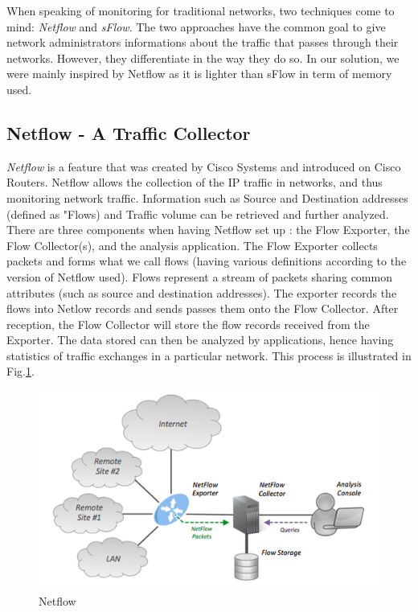 When speaking of monitoring for traditional networks, two techniques come to mind: \textit{Netflow} and \textit{sFlow}. The two approaches have the common goal to give network administrators informations about the traffic that passes through their networks. However, they differentiate in the way they do so. In our solution, we were mainly inspired by Netflow as it is lighter than sFlow in term of memory used.

\subsection{Netflow - A Traffic Collector}

\textit{Netflow} is a feature that was created by Cisco Systems and introduced on Cisco Routers. Netflow allows the collection of the IP traffic in networks, and thus monitoring network traffic. Information such as Source and Destination addresses (defined as "Flows) and Traffic volume can be retrieved and further analyzed.\\

There are three components when having Netflow set up : the Flow Exporter, the Flow Collector(s), and the analysis application. The Flow Exporter collects packets and forms what we call flows (having various definitions according to the version of Netflow used). Flows represent a stream of packets sharing common attributes (such as source and destination addresses). The exporter records the flows into Netlow records and sends passes them onto the Flow Collector. After reception, the Flow Collector will store the flow records received from the Exporter. The data stored can then be analyzed by applications, hence having statistics of traffic exchanges in a particular network. This process is illustrated in Fig.\ref{fig:netflow}.\\

\begin{figure}
  \centering
  \includegraphics[width=\textwidth]{res/netflow.png}
  \caption{Netflow}
  \label{fig:netflow}
\end{figure}

